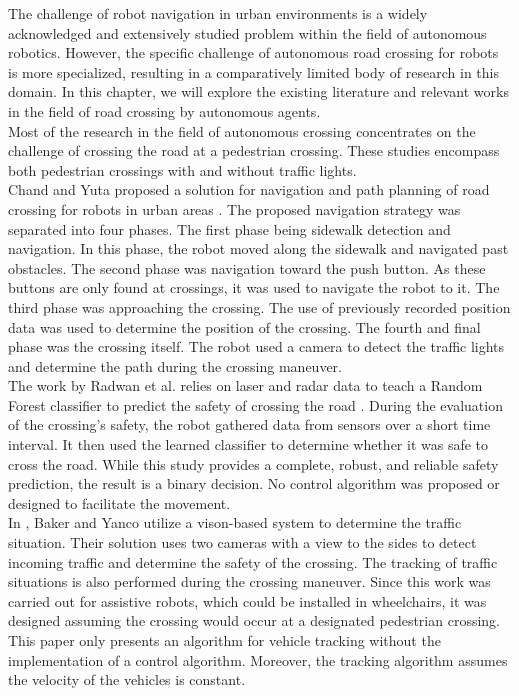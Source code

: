 The challenge of robot navigation in urban environments is a widely acknowledged and extensively studied problem within the field of autonomous robotics. However, the specific challenge of autonomous road crossing for robots is more specialized, resulting in a comparatively limited body of research in this domain. In this chapter, we will explore the existing literature and relevant works in the field of road crossing by autonomous agents.\\
Most of the research in the field of autonomous crossing concentrates on the challenge of crossing the road at a pedestrian crossing. These studies encompass both pedestrian crossings with and without traffic lights.\\
Chand and Yuta proposed a solution for navigation and path planning of road crossing for robots in urban areas \cite{Chand}. The proposed navigation strategy was separated into four phases. The first phase being sidewalk detection and navigation. In this phase, the robot moved along the sidewalk and navigated past obstacles. The second phase was navigation toward the push button. As these buttons are only found at crossings, it was used to navigate the robot to it. The third phase was approaching the crossing. The use of previously recorded position data was used to determine the position of the crossing. The fourth and final phase was the crossing itself. The robot used a camera to detect the traffic lights and determine the path during the crossing maneuver.\\
The work by Radwan et al. relies on laser and radar data to teach a Random Forest classifier to predict the safety of crossing the road \cite{Radwan}. During the evaluation of the crossing's safety, the robot gathered data from sensors over a short time interval. It then used the learned classifier to determine whether it was safe to cross the road. While this study provides a complete, robust, and reliable safety prediction, the result is a binary decision. No control algorithm was proposed or designed to facilitate the movement.\\
In \cite{Baker}, Baker and Yanco utilize a vison-based system to determine the traffic situation. Their solution uses two cameras with a view to the sides to detect incoming traffic and determine the safety of the crossing. The tracking of traffic situations is also performed during the crossing maneuver. Since this work was carried out for assistive robots, which could be installed in wheelchairs, it was designed assuming the crossing would occur at a designated pedestrian crossing. This paper only presents an algorithm for vehicle tracking without the implementation of a control algorithm. Moreover, the tracking algorithm assumes the velocity of the vehicles is constant.\\\\
